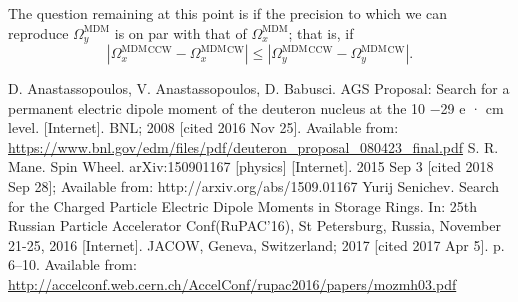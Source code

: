 \documentclass{article}
\newcommand{\W}{\Omega}
\newcommand{\MDM}{^\mathrm{MDM}}
\newcommand{\CW}{^\mathrm{CW}}
\newcommand{\CCW}{^\mathrm{CCW}}
\begin{document}
The question remaining at this point is if the precision to which we can reproduce $\W_y\MDM$ is on par with that of $\W_x\MDM$; that is, if
\begin{equation}\label{eq:calibration_condition}
  |\W_x\MDM\CCW - \W_x\MDM\CW| \leq |\W_y\MDM\CCW - \W_y\MDM\CW|.
\end{equation}

\begin{thebibliography}{99}
  D. Anastassopoulos, V. Anastassopoulos, D. Babusci. AGS Proposal: Search for a permanent electric dipole moment of the deuteron nucleus at the 10 −29 e · cm level. [Internet]. BNL; 2008 [cited 2016 Nov 25]. Available from: \url{https://www.bnl.gov/edm/files/pdf/deuteron_proposal_080423_final.pdf}
S. R. Mane. Spin Wheel. arXiv:150901167 [physics] [Internet]. 2015 Sep 3 [cited 2018 Sep 28]; Available from: http://arxiv.org/abs/1509.01167
  Yurij Senichev. Search for the Charged Particle Electric Dipole Moments in Storage Rings. In: 25th Russian Particle Accelerator Conf(RuPAC’16), St Petersburg, Russia, November 21-25, 2016 [Internet]. JACOW, Geneva, Switzerland; 2017 [cited 2017 Apr 5]. p. 6–10. Available from: \url{http://accelconf.web.cern.ch/AccelConf/rupac2016/papers/mozmh03.pdf}

\end{thebibliography}
\end{document}
